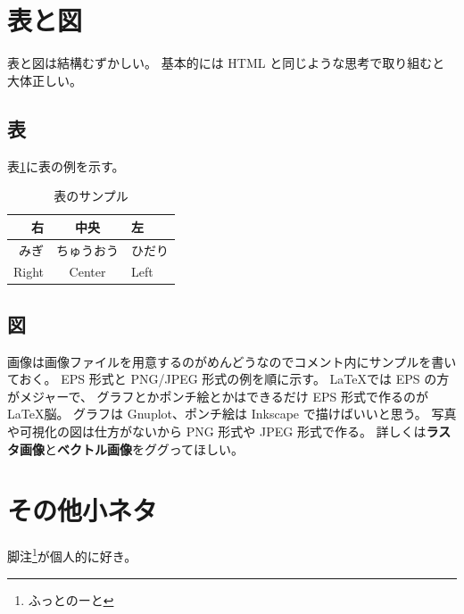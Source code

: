 \documentclass[14pt,a4j]{jsarticle}
\begin{document}
\section{表と図}
表と図は結構むずかしい。
基本的には HTML と同じような思考で取り組むと大体正しい。
\subsection{表}
表\ref{tab:sample}に表の例を示す。
%
\begin{table}[htbp] %
 \centering %
 \caption{表のサンプル}\label{tab:sample} %
 \begin{tabular}{r|cl} %
  \hline %
  右 & 中央 & 左 \\
  \hline\hline %
  みぎ  & ちゅうおう & ひだり \\
  Right & Center     & Left \\
  \hline
 \end{tabular}
\end{table}
%
\subsection{図}
画像は画像ファイルを用意するのがめんどうなのでコメント内にサンプルを書いておく。
EPS 形式と PNG/JPEG 形式の例を順に示す。
\LaTeX では EPS の方がメジャーで、
グラフとかポンチ絵とかはできるだけ EPS 形式で作るのが \LaTeX 脳。
グラフは Gnuplot、ポンチ絵は Inkscape で描けばいいと思う。
写真や可視化の図は仕方がないから PNG 形式や JPEG 形式で作る。
詳しくは\textbf{ラスタ画像}と\textbf{ベクトル画像}をググってほしい。
%
%
%
\section{その他小ネタ}
脚注\footnote{ふっとのーと}が個人的に好き。
\end{document}
